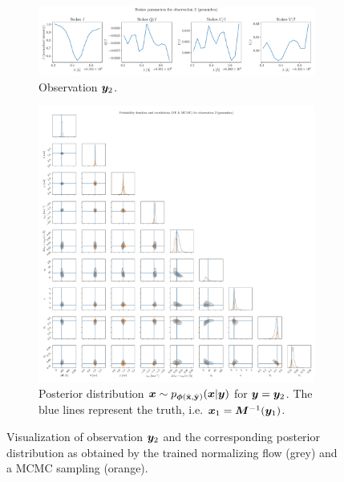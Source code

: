 \documentclass[a4paper,12pt]{report}
\begin{document}
\begin{figure}[h]
	\centering
	\begin{subfigure}[t]{\textwidth}
	\centering
	\includegraphics[width=\textwidth]{figures/nf-milne-eddington-example-6-corner-spectrum-2-nf-nflows-piecewisequadratic.pdf}
    \caption{Observation $\bm{y}_2$.}
	\end{subfigure}
	\begin{subfigure}[t]{\textwidth}
	\centering
	\includegraphics[width=\textwidth]{figures/nf-milne-eddington-example-6-corner-2-nf-mcmc-nflows-piecewisequadratic.pdf}
    \caption{Posterior distribution $\bm{x}\sim p_{\bm{\phi}(\hat{\boldsymbol{\mathbf{x}}},\hat{\boldsymbol{\mathbf{y}}})}(\bm{x}|\bm{y})$ for $\bm{y} = \bm{y}_2$. The blue lines represent the truth, i.e. $\bm{x}_1 = \bm{M}^{-1}(\bm{y}_1)$.}
	\end{subfigure}
\cprotect\caption{Visualization of observation $\bm{y}_2$ and the corresponding posterior distribution as obtained by the trained normalizing flow (grey) and a MCMC sampling (orange).}
\label{fig:nf-milne-eddington-example-6-corner-2-nf-piecewisequadratic-results}
\end{figure}
\end{document}
